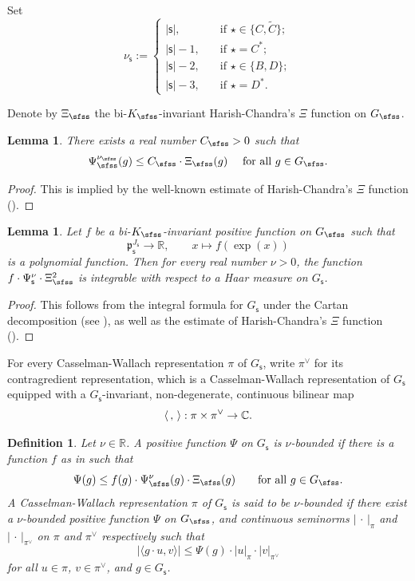 \documentclass[11pt,a4paper]{amsart}
\def\abs#1{\left|{#1}\right|}
\newcommand{\p}{\mathfrak p}
\newcommand{\R}{\mathbb R}
\newcommand{\la}{\langle}
\newcommand{\ra}{\rangle}
\newcommand{\be}{\begin {equation}}
\newcommand{\ee}{\end {equation}}
\numberwithin{equation}{section}
\newtheorem{lem}[thm]{Lemma}
\newtheorem{defn}[thm]{Definition}
\theoremstyle{remark}
\begin{document}
Set
\be\label{def:nus}
  \nu_\mathsf s:=\begin{cases}
    \abs{\mathsf s},\quad &\textrm{if }\star\in \{C, \widetilde C\};\\
     \abs{\mathsf s}-1,\quad & \textrm{if }\star= C^*;\\
      \abs{\mathsf s}-2,\quad & \textrm{if }\star\in \{B,D\};\\
       \abs{\mathsf s}-3,\quad & \textrm{if }\star= D^*.
  \end{cases}
\ee

Denote by $\Xi_\sfss$ the bi-$K_\sfss$-invariant Harish-Chandra's $\Xi$ function on $G_\sfss$.

\begin{lem}\label{boundpsi}
There exists a real number $C_\sfss>0$ such that
\[
  \Psi_\sfss^{\nu_\sfss}(g)\leq C_\sfss\cdot \Xi_\sfss (g)\quad\textrm{ for all $g\in G_\sfss$}.
\]

\end{lem}
\begin{proof}
This is implied by the well-known  estimate of Harish-Chandra's $\Xi$ function (\cite[Theorem 4.5.3]{Wa1}).
\end{proof}



\begin{lem}\label{int}
Let $f$ be a bi-$K_\sfss$-invariant positive function  on $G_\sfss$  such that
\[
  \p_\mathsf s^{J_\mathsf s}\rightarrow \R, \qquad x\mapsto f(\exp(x))
\]
is a polynomial function. Then for every real number $\nu>0$, the function $f\cdot \Psi_\mathsf s^\nu\cdot \Xi_\sfss^2$ is integrable with respect to a Haar measure on $G_\mathsf s$.
\end{lem}
\begin{proof}
  This follows from the integral formula for $G_\mathsf s$ under the Cartan decomposition (see
 \cite[Lemma 2.4.2]{Wa1}), as well as the  estimate of Harish-Chandra's $\Xi$ function (\cite[Theorem 4.5.3]{Wa1}).
\end{proof}

For every Casselman-Wallach representation $\pi$ of $G_\mathsf s$, write $\pi^\vee$ for its contragredient representation, which is a  Casselman-Wallach representation  of $G_\mathsf s$ equipped with a $G_{\mathsf s}$-invariant, non-degenerate, continuous bilinear map
 \[
   \la\,,\,\ra: \pi \times\pi^\vee\rightarrow \C.
 \]

\begin{defn}
Let $\nu\in \R$. 
A  positive function $\Psi$ on $G_\mathsf s$ is $\nu$-bounded if there is
a  function $f$ as in  
such that
\[
  \Psi(g)\leq f(g)\cdot \Psi_{\sfss}^\nu(g)\cdot \Xi_\sfss(g)\qquad \textrm{for all }g\in G_\sfss.
\]
A Casselman-Wallach representation $\pi$ of $G_\mathsf s$ is said to be $\nu$-bounded if there
exist a $\nu$-bounded positive function $\Psi$ on $G_\sfss$, and continuous seminorms $\abs{\,\cdot\,}_{\pi}$ and $\abs{\,\cdot\,}_{\pi^\vee}$ on  $ \pi$ and $\pi^\vee$ respectively such that
\[
 \abs{ \la g \cdot u, v\ra}\leq \Psi(g)\cdot \abs{u}_{\pi}\cdot \abs{v}_{\pi^\vee}
\]
for all $u\in \pi$, $v\in \pi^\vee$, and $g\in G_{\mathsf s}$.

\end{defn}
\end{document}
